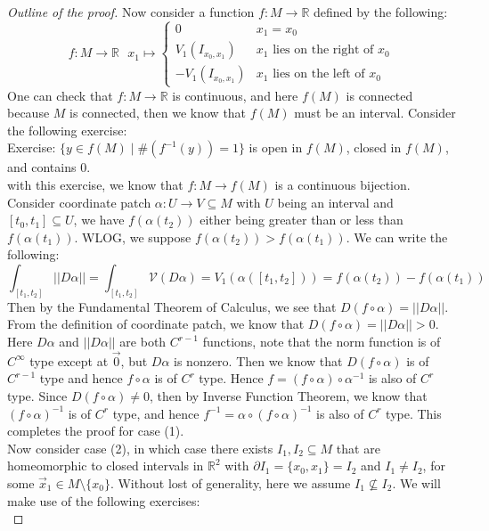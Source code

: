 \documentclass[11pt,oneside]{book}
\theoremstyle{break}
\theoremstyle{break}
\newcommand{\R}{\mathbb{R}}
\newcommand{\exercise}{\color{green}Exercise: \color{black}}
\begin{document}
\begin{proof}[Outline of the proof]
Now consider a function $f:M \to \R$ defined by the following: 
$$f:M \to \R \ \ \ x_1\mapsto\begin{cases} 0 & x_1 = x_0 \\ V_1(I_{x_0,x_1}) & x_1\text{ lies on the right of }x_0 \\ -V_1(I_{x_0,x_1}) & x_1\text{ lies on the left of }x_0\end{cases}$$ 
One can check that $f:M \to \R$ is continuous, and here $f(M)$ is connected because $M$ is connected, then we know that $f(M)$ must be an interval. Consider the following exercise:\\

\exercise $\{y \in f(M)\mid \#(f^{-1}(y)) = 1\}$ is open in $f(M)$, closed in $f(M)$, and contains $0$. \\

with this exercise, we know that $f:M \to f(M)$ is a continuous bijection. Consider coordinate patch $\alpha: U \to V \subseteq M$ with $U$ being an interval and $[t_0,t_1] \subseteq U$, we have $f(\alpha(t_2))$ either being greater than or less than $f(\alpha(t_1))$. WLOG, we suppose $f(\alpha(t_2)) > f(\alpha(t_1))$. We can write the following:
$$\int_{[t_1,t_2]} ||D\alpha|| = \int_{[t_1,t_2]} \mathcal{V}(D\alpha) = V_1(\alpha([t_1,t_2])) = f(\alpha(t_2)) - f(\alpha(t_1))$$
Then by the Fundamental Theorem of Calculus, we see that $D(f\circ \alpha) = ||D\alpha||$. From the definition of coordinate patch, we know that $D(f\circ \alpha) = ||D\alpha|| > 0$. Here $D\alpha$ and $||D\alpha||$ are both $C^{r-1}$ functions, note that the norm function is of $C^\infty$ type except at $\vec{0}$, but $D\alpha$ is nonzero. Then we know that $D(f\circ \alpha)$ is of $C^{r-1}$ type and hence $f\circ \alpha$ is of $C^r$ type. Hence $f = (f\circ \alpha) \circ \alpha^{-1}$ is also of $C^r$ type.  Since $D(f\circ \alpha) \neq 0$, then by Inverse Function Theorem, we know that $(f\circ \alpha)^{-1}$ is of $C^r$ type, and hence $f^{-1} = \alpha \circ (f\circ \alpha)^{-1}$ is also of $C^r$ type. This completes the proof for case (1).\\

Now consider case (2), in which case there exists $I_1, I_2 \subseteq M$ that are homeomorphic to closed intervals in $\R^2$ with $\partial I_1 = \{x_0,x_1\} = I_2$ and $I_1 \neq I_2$, for some $\vec{x}_1 \in M\setminus\{x_0\}$. Without lost of generality, here we assume $I_1 \nsubseteq I_2$. We will make use of the following exercises:\\


\end{proof}
\end{document}

